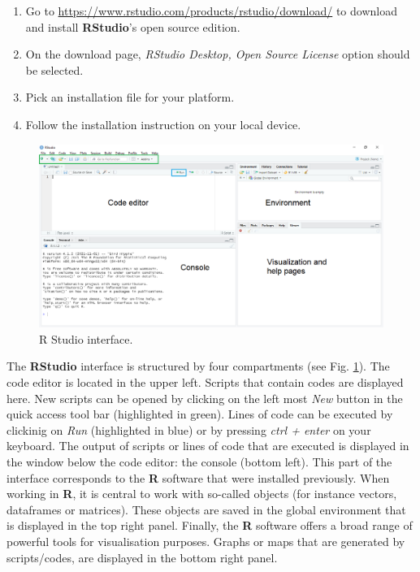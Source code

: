 \documentclass[
  10pt,
  b5paper,
  oneside]{book}
\providecommand{\tightlist}{%
  \setlength{\itemsep}{0pt}\setlength{\parskip}{0pt}}
\begin{document}
\begin{enumerate}
\def\labelenumi{\arabic{enumi}.}
\tightlist
\item
  Go to \url{https://www.rstudio.com/products/rstudio/download/} to download and install \textbf{RStudio}'s open source edition.
\item
  On the download page, \emph{RStudio Desktop, Open Source License} option should be selected.
\item
  Pick an installation file for your platform.
\item
  Follow the installation instruction on your local device.
\end{enumerate}

\begin{figure}
\includegraphics[width=1\linewidth]{images/2_RStudio-interface} \caption{R Studio interface.}\label{fig:Rstudio}
\end{figure}

The \textbf{RStudio} interface is structured by four compartments (see Fig. \ref{fig:Rstudio}). The code editor is located in the upper left. Scripts that contain codes are displayed here. New scripts can be opened by clicking on the left most \emph{New} button in the quick access tool bar (highlighted in green). Lines of code can be executed by clickinig on \emph{Run} (highlighted in blue) or by pressing \emph{ctrl + enter} on your keyboard.
The output of scripts or lines of code that are executed is displayed in the window below the code editor: the console (bottom left). This part of the interface corresponds to the \textbf{R} software that were installed previously.
When working in \textbf{R}, it is central to work with so-called objects (for instance vectors, dataframes or matrices). These objects are saved in the global environment that is displayed in the top right panel.
Finally, the \textbf{R} software offers a broad range of powerful tools for visualisation purposes. Graphs or maps that are generated by scripts/codes, are displayed in the bottom right panel.
\end{document}
